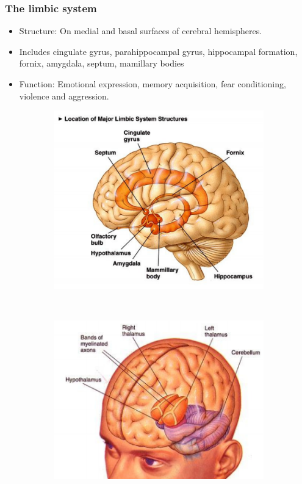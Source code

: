 \documentclass[a4paper, 12pt]{article}
\begin{document}
\subsubsection{The limbic system}
\begin{itemize}[noitemsep,nolistsep]
	\item Structure: On medial and basal surfaces of cerebral hemispheres.
	\item Includes cingulate gyrus, parahippocampal gyrus, hippocampal formation, fornix, amygdala, septum, mamillary bodies
	\item Function: Emotional expression, memory acquisition, fear conditioning, violence and aggression.
\end{itemize}
\begin{figure}[H]
	\centering
	\begin{subfigure}[b]{0.5\textwidth}
		\centering
		\includegraphics[width=\textwidth]{brain_anatomy_02.png}
	\end{subfigure}%
	~
	\begin{subfigure}[b]{0.5\textwidth}
		\centering
		\includegraphics[width=\textwidth]{brain_anatomy_03.png}
	\end{subfigure}
\end{figure}
\end{document}

